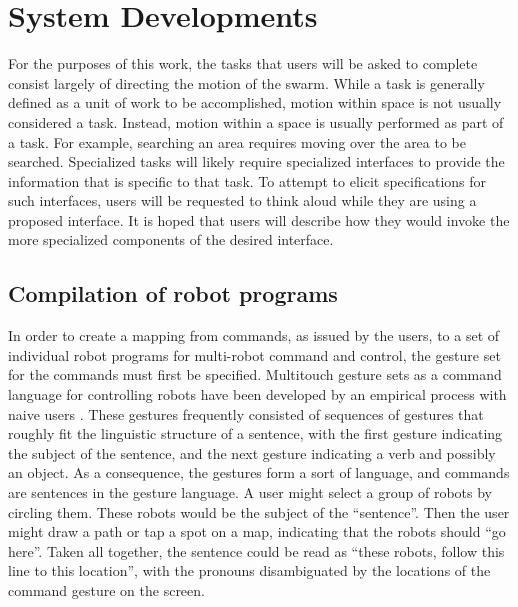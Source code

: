 \chapter{System Developments}

For the purposes of this work, the tasks that users will be asked to complete consist largely of directing the motion of the swarm. 
While a task is generally defined as a unit of work to be accomplished, motion within space is not usually considered a task. 
Instead, motion within a space is usually performed as part of a task.
For example, searching an area requires moving over the area to be searched.
Specialized tasks will likely require specialized interfaces to provide the information that is specific to that task. 
To attempt to elicit specifications for such interfaces, users will be requested to think aloud while they are using a proposed interface. 
It is hoped that users will describe how they would invoke the more specialized components of the desired interface. 

\section{Compilation of robot programs}

In order to create a mapping from commands, as issued by the users, to a set of individual robot programs for multi-robot command and control, the gesture set for the commands must first be specified. 
Multitouch gesture sets as a command language for controlling robots have been developed by an empirical process with naive users \citep{Micire:2009:ANG:1731903.1731912}. 
These gestures frequently consisted of sequences of gestures that roughly fit the linguistic structure of a sentence, with the first gesture indicating the subject of the sentence, and the next gesture indicating a verb and possibly an object. 
As a consequence, the gestures form a sort of language, and commands are sentences in the gesture language.
A user might select a group of robots by circling them. 
These robots would be the subject of the ``sentence''.
Then the user might draw a path or tap a spot on a map, indicating that the robots should ``go here''. 
Taken all together, the sentence could be read as ``these robots, follow this line to this location'', with the pronouns disambiguated by the locations of the command gesture on the screen.

